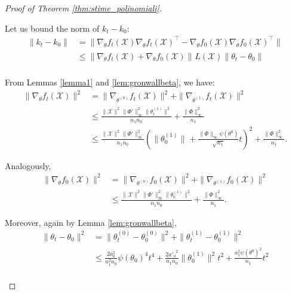 \documentclass[10pt,a4paper]{amsart}
\newcommand{\X}{\mathcal{X}}
\newcommand{\norm}[2]{
    \|#1\|_{#2}
}
\newcommand{\s}{\psi}
\begin{document}
\begin{proof}[Proof of Theorem \ref{thm:stime_polinomiali}]
\begin{itemize}
        Let us bound the norm of $k_t-k_0$:
        \begin{align}
            \norm{k_t-k_0}{}&= \norm{\nabla_\theta f_t(\X)\nabla_\theta f_t(\X)^\top-\nabla_\theta f_0(\X)\nabla_\theta f_0(\X)^\top }{}\\
            &\le \norm{\nabla_\theta f_t(\X)+\nabla_\theta f_0(\X)}{}L(\X)\norm{\theta_t-\theta_0}{}\\
        \end{align}

        From Lemmas \ref{lemma1} and \ref{lem:gronwallbeta}, we have:
        \begin{align}
            \norm{\nabla_\theta f_t(\X)}{}^2 &=\norm{\nabla_{\theta^{(0)}}f_t(\X)}{}^2+\norm{\nabla_{\theta^{(1)}} f_t(\X)}{}^2\\
            &\le \frac{\norm{\X}{}^2\norm{\Phi'}{\infty}^2\norm{\theta^{(1)}_t}{}^2}{n_1n_0} + \frac{\norm{\Phi}{\infty}^2}{n_1}\\
            &\label{eqaux_delta1}\le \frac{\norm{\X}{}^2\norm{\Phi'}{\infty}^2}{n_1n_0}\left(\norm{\theta^{(1)}_0}{} + \frac{\norm{\Phi}{\infty}\s(\theta^0)}{\sqrt{n_1}}t\right)^2 + \frac{\norm{\Phi}{\infty}^2}{n_1}.
        \end{align}

        Analogously,
        \begin{align}
            \norm{\nabla_\theta f_0(\X)}{}^2 &=\norm{\nabla_{\theta^{(0)}}f_0(\X)}{}^2+\norm{\nabla_{\theta^{(1)}} f_0(\X)}{}^2\\
            &\label{eqaux_delta2}\le \frac{\norm{\X}{}^2\norm{\Phi'}{\infty}^2\norm{\theta^{(1)}_0}{}^2}{n_1n_0} + \frac{\norm{\Phi}{\infty}^2}{n_1}.
        \end{align}

        Moreover, again by Lemma \ref{lem:gronwallbeta},
        \begin{align}
            \norm{\theta_t-\theta_0}{}^2 &= \norm{\theta_t^{(0)}-\theta_0^{(0)}}{}^2 + \norm{\theta_t^{(1)}-\theta_0^{(1)}}{}^2 \\
            &\label{eqaux_delta3}\le \frac{2a_0^2}{n_1^2n_0}\s(\theta_0)^4t^4 + \frac{2{a'_0}^2}{n_1n_0}\norm{\theta^{(1)}_0}{}^2t^2 +\frac{a_1^2\s(\theta^0)^2}{n_1}t^2 \\
        \end{align}


\end{itemize}
\end{proof}
\end{document}
